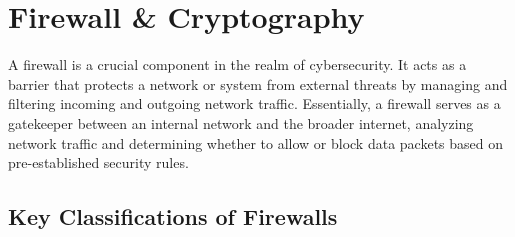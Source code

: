 \section{Firewall \& Cryptography}

A firewall is a crucial component in the realm of cybersecurity. It acts as a barrier that protects a network or system from external threats by managing and filtering incoming and outgoing network traffic. Essentially, a firewall serves as a gatekeeper between an internal network and the broader internet, analyzing network traffic and determining whether to allow or block data packets based on pre-established security rules.


\subsection{Key Classifications of Firewalls}
